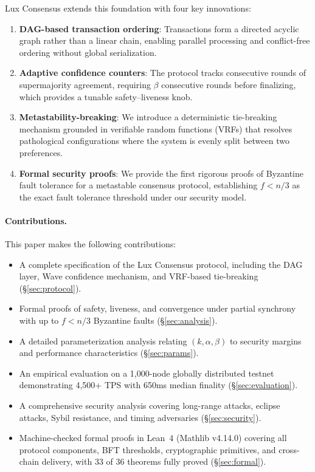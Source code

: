 Lux Consensus extends this foundation with four key innovations:
\begin{enumerate}
\item \textbf{DAG-based transaction ordering}: Transactions form a directed acyclic graph
rather than a linear chain, enabling parallel processing and conflict-free ordering without
global serialization.
\item \textbf{Adaptive confidence counters}: The protocol tracks consecutive rounds of
supermajority agreement, requiring $\beta$ consecutive rounds before finalizing, which
provides a tunable safety--liveness knob.
\item \textbf{Metastability-breaking}: We introduce a deterministic tie-breaking mechanism
grounded in verifiable random functions (VRFs) that resolves pathological configurations
where the system is evenly split between two preferences.
\item \textbf{Formal security proofs}: We provide the first rigorous proofs of Byzantine
fault tolerance for a metastable consensus protocol, establishing $f < n/3$ as the exact fault
tolerance threshold under our security model.
\end{enumerate}

\paragraph{Contributions.}
This paper makes the following contributions:
\begin{itemize}[nosep]
\item A complete specification of the Lux Consensus protocol, including the DAG layer,
Wave confidence mechanism, and VRF-based tie-breaking (\S\ref{sec:protocol}).
\item Formal proofs of safety, liveness, and convergence under partial synchrony with
up to $f < n/3$ Byzantine faults (\S\ref{sec:analysis}).
\item A detailed parameterization analysis relating $(k, \alpha, \beta)$ to security
margins and performance characteristics (\S\ref{sec:params}).
\item An empirical evaluation on a 1,000-node globally distributed testnet demonstrating
4,500+ TPS with 650ms median finality (\S\ref{sec:evaluation}).
\item A comprehensive security analysis covering long-range attacks, eclipse attacks,
Sybil resistance, and timing adversaries (\S\ref{sec:security}).
\item Machine-checked formal proofs in Lean~4 (Mathlib v4.14.0) covering all protocol
components, BFT thresholds, cryptographic primitives, and cross-chain delivery,
with 33 of 36 theorems fully proved (\S\ref{sec:formal}).
\end{itemize}

